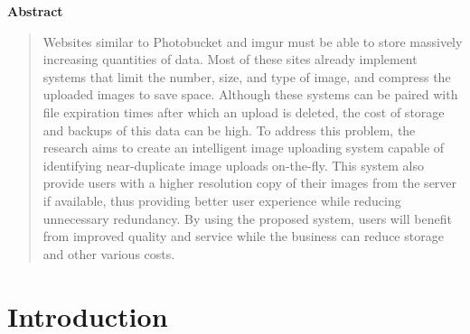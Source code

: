\documentclass[11pt]{article}
\begin{document}
\begin{center}
\large\bf Abstract
\vspace{-1em}  %
\end{center}


\begin{quote}
Websites similar to Photobucket and imgur must be able to store massively increasing quantities of data. Most of these sites already implement systems that limit the number, size, and type of image, and compress the uploaded images to save space. Although these systems can be paired with file expiration times after which an upload is deleted, the cost of storage and backups of this data can be high. To address this problem, the research aims to create an intelligent image uploading system capable of identifying near-duplicate image uploads on-the-fly. This system also provide users with a higher resolution copy of their images from the server if available, thus providing better user experience while reducing unnecessary redundancy. By using the proposed system, users will benefit from improved quality and service while the business can reduce storage and other various costs.
\end{quote}

\section{Introduction}
\label{sec:introduction}
\vspace*{-.1in}

\end{document}
